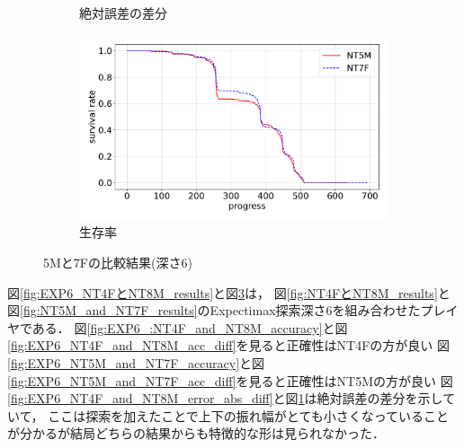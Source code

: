 \begin{figure}[t]
\begin{subfigure}[b]{0.49\linewidth}
    \caption{絶対誤差の差分}
    \label{fig:EXP6_NT5M_and_NT7F_error_abs_diff}
\end{subfigure}
\begin{subfigure}[b]{0.49\linewidth}
    \includegraphics[width=\linewidth]{pdf/compare/EXP6_NT5M_and_NT7F/survival.pdf}
    \caption{生存率}
    \label{fig:EXP6_NT5M_and_NT7F_survival}
\end{subfigure}
\caption{5Mと7Fの比較結果(深さ6)}
\label{fig:EXP6_NT5M_and_NT7F_results}
\end{figure}

図\ref{fig:EXP6_NT4FとNT8M_results}と図\ref{fig:EXP6_NT5M_and_NT7F_results}は，
図\ref{fig:NT4FとNT8M_results}と図\ref{fig:NT5M_and_NT7F_results}のExpectimax探索深さ6を組み合わせたプレイヤである．
図\ref{fig:EXP6_:NT4F_and_NT8M_accuracy}と図\ref{fig:EXP6_NT4F_and_NT8M_acc_diff}を見ると正確性はNT4Fの方が良い
図\ref{fig:EXP6_NT5M_and_NT7F_accuracy}と図\ref{fig:EXP6_NT5M_and_NT7F_acc_diff}を見ると正確性はNT5Mの方が良い
図\ref{fig:EXP6_NT4F_and_NT8M_error_abs_diff}と図\ref{fig:EXP6_NT5M_and_NT7F_error_abs_diff}は絶対誤差の差分を示していて，
ここは探索を加えたことで上下の振れ幅がとても小さくなっていることが分かるが結局どちらの結果からも特徴的な形は見られなかった．
